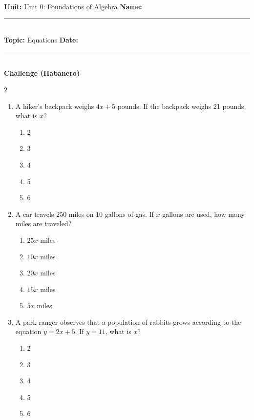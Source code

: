 \documentclass[10pt]{article}
\begin{document}
\enlargethispage{2.5cm}

\begin{tcolorbox}[colback=mainblue!5, colframe=mainblue, sharp corners, boxrule=0.5pt]
    \small \textbf{Unit:} Unit 0: Foundations of Algebra \hfill \textbf{Name:} \rule{3cm}{0.4pt} \\
    \small \textbf{Topic:} Equations \hfill \textbf{Date:} \rule{2cm}{0.4pt} \\
    \centering \textbf{\large Challenge (Habanero)}
\end{tcolorbox}

\vspace{0.2cm}

\begin{multicols}{2}
\begin{enumerate}[label=\textbf{Q\arabic*.}, leftmargin=*, itemsep=6pt, parsep=0pt]

  \item \small A hiker's backpack weighs $4x + 5$ pounds. If the backpack weighs 21 pounds, what is $x$?
  \begin{enumerate}[label=(\Alph*), leftmargin=0.6cm, nosep, itemsep=2pt]
    \item 2
    \item 3
    \item 4
    \item 5
    \item 6
  \end{enumerate}

  \item \small A car travels $250$ miles on $10$ gallons of gas. If $x$ gallons are used, how many miles are traveled?
  \begin{enumerate}[label=(\Alph*), leftmargin=0.6cm, nosep, itemsep=2pt]
    \item $25x$ miles
    \item $10x$ miles
    \item $20x$ miles
    \item $15x$ miles
    \item $5x$ miles
  \end{enumerate}

  \item \small A park ranger observes that a population of rabbits grows according to the equation $y = 2x + 5$. If $y = 11$, what is $x$?
  \begin{enumerate}[label=(\Alph*), leftmargin=0.6cm, nosep, itemsep=2pt]
    \item 2
    \item 3
    \item 4
    \item 5
    \item 6
  \end{enumerate}


\end{enumerate}
\end{multicols}
\end{document}
